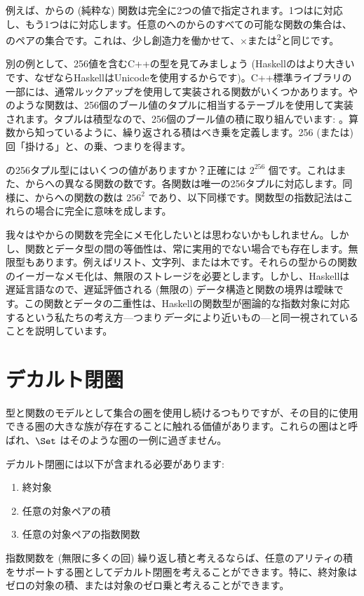 例えば、からの (純粋な) 関数は完全に2つの値で指定されます。1つはに対応し、もう1つはに対応します。任意のへのからのすべての可能な関数の集合は、のペアの集合です。これは、少し創造力を働かせて、×または\textsuperscript{2}と同じです。

別の例として、256値を含むC++の型を見てみましょう (Haskellのはより大きいです、なぜならHaskellはUnicodeを使用するからです)。C++標準ライブラリの一部には、通常ルックアップを使用して実装される関数がいくつかあります。やのような関数は、256個のブール値のタプルに相当するテーブルを使用して実装されます。タプルは積型なので、256個のブール値の積に取り組んでいます: 。算数から知っているように、繰り返される積はべき乗を定義します。256 (または) 回「掛ける」と、の乗、つまり\textsuperscript{}を得ます。

の256タプル型にはいくつの値がありますか？正確には $2^{256}$ 個です。これはまた、からへの異なる関数の数です。各関数は唯一の256タプルに対応します。同様に、からへの関数の数は $256^{2}$ であり、以下同様です。関数型の指数記法はこれらの場合に完全に意味を成します。

我々はやからの関数を完全にメモ化したいとは思わないかもしれません。しかし、関数とデータ型の間の等価性は、常に実用的でない場合でも存在します。無限型もあります。例えばリスト、文字列、または木です。それらの型からの関数のイーガーなメモ化は、無限のストレージを必要とします。しかし、Haskellは遅延言語なので、遅延評価される (無限の) データ構造と関数の境界は曖昧です。この関数とデータの二重性は、Haskellの関数型が圏論的な指数対象に対応するという私たちの考え方---つまり\emph{データ}により近いもの---と同一視されていることを説明しています。

\section{デカルト閉圏}

型と関数のモデルとして集合の圏を使用し続けるつもりですが、その目的に使用できる圏の大きな族が存在することに触れる価値があります。これらの圏はと呼ばれ、$\Set$ はそのような圏の一例に過ぎません。

デカルト閉圏には以下が含まれる必要があります: 

\begin{enumerate}
  \tightlist
  \item
        終対象
  \item
        任意の対象ペアの積
  \item
        任意の対象ペアの指数関数
\end{enumerate}
指数関数を (無限に多くの回) 繰り返し積と考えるならば、任意のアリティの積をサポートする圏としてデカルト閉圏を考えることができます。特に、終対象はゼロの対象の積、または対象のゼロ乗と考えることができます。

